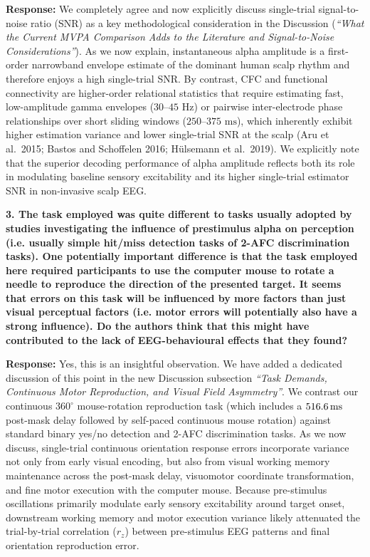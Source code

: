 \documentclass[11pt]{article}
\newcommand{\revcomment}[1]{\vspace{6pt}\noindent\textbf{\textcolor{commentgray}{#1}}\par\vspace{2pt}}
\newcommand{\authorresp}[1]{\noindent\textcolor{revblue}{\textbf{Response:}} #1\par\vspace{6pt}}
\begin{document}
\authorresp{We completely agree and now explicitly discuss single-trial signal-to-noise ratio (SNR) as a key methodological consideration in the Discussion (\textit{``What the Current MVPA Comparison Adds to the Literature and Signal-to-Noise Considerations''}). As we now explain, instantaneous alpha amplitude is a first-order narrowband envelope estimate of the dominant human scalp rhythm and therefore enjoys a high single-trial SNR. By contrast, CFC and functional connectivity are higher-order relational statistics that require estimating fast, low-amplitude gamma envelopes ($30\text{--}45\text{ Hz}$) or pairwise inter-electrode phase relationships over short sliding windows ($250\text{--}375\text{ ms}$), which inherently exhibit higher estimation variance and lower single-trial SNR at the scalp (Aru et al.\ 2015; Bastos and Schoffelen 2016; H\"ulsemann et al.\ 2019). We explicitly note that the superior decoding performance of alpha amplitude reflects both its role in modulating baseline sensory excitability and its higher single-trial estimator SNR in non-invasive scalp EEG.}

\revcomment{3. The task employed was quite different to tasks usually adopted by studies investigating the influence of prestimulus alpha on perception (i.e. usually simple hit/miss detection tasks of 2-AFC discrimination tasks). One potentially important difference is that the task employed here required participants to use the computer mouse to rotate a needle to reproduce the direction of the presented target. It seems that errors on this task will be influenced by more factors than just visual perceptual factors (i.e. motor errors will potentially also have a strong influence). Do the authors think that this might have contributed to the lack of EEG-behavioural effects that they found?}

\authorresp{Yes, this is an insightful observation. We have added a dedicated discussion of this point in the new Discussion subsection \textit{``Task Demands, Continuous Motor Reproduction, and Visual Field Asymmetry''}. We contrast our continuous $360^\circ$ mouse-rotation reproduction task (which includes a $516.6\,\text{ms}{}$ post-mask delay followed by self-paced continuous mouse rotation) against standard binary yes/no detection and 2-AFC discrimination tasks. As we now discuss, single-trial continuous orientation response errors incorporate variance not only from early visual encoding, but also from visual working memory maintenance across the post-mask delay, visuomotor coordinate transformation, and fine motor execution with the computer mouse. Because pre-stimulus oscillations primarily modulate early sensory excitability around target onset, downstream working memory and motor execution variance likely attenuated the trial-by-trial correlation ($r_z$) between pre-stimulus EEG patterns and final orientation reproduction error.}
\end{document}

